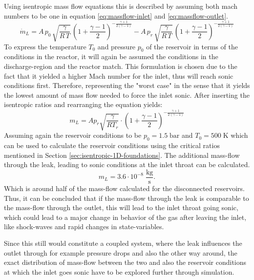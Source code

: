 	Using isentropic mass flow equations this is described by assuming both mach numbers to be one in equation \eqref{eq:massflow-inlet} and \eqref{eq:massflow-outlet}.
	$$
		\dot{m}_L =
		A\, p_0\, \sqrt{\frac{\gamma}{R\,T}}\, \left(1+\frac{\gamma-1}{2}\right)^{-\frac{\gamma+1}{2(\gamma-1)}}
		- A\, p_r\, \sqrt{\frac{\gamma}{R\,T}}\,\left(1+\frac{\gamma-1}{2}\right)^{-\frac{\gamma+1}{2(\gamma-1)}}
	$$
	To express the temperature $T_0$ and pressure $p_0$ of the reservoir in terms of the conditions in the reactor, it will again be assumed the conditions in the discharge-region and the reactor match.
	This formulation is chosen due to the fact that it yielded a higher Mach number for the inlet, thus will reach sonic conditions first.
	Therefore, representing the "worst case" in the sense that it yields the lowest amount of mass flow needed to force the inlet sonic.
	After inserting the isentropic ratios and rearranging the equation yields:
	\begin{equation}
		m_L =
		A p_r\sqrt{\frac{\gamma}{R T_r}}\cdot
			\left(
				1 + \frac{\gamma - 1}{2}
			\right)
				^{-\frac{\gamma + 1}{2\,(\gamma - 1)}}
	\end{equation}
	Assuming again the reservoir conditions to be $p_0 = 1.5\;\text{bar}$ and $T_0 = 500\;\text{K}$ which can be used to calculate the reservoir conditions using the critical ratios mentioned in Section \ref{sec:isentropic-1D-foundations}.
	The additional mass-flow through the leak, leading to sonic conditions at the inlet throat can be calculated.
	$$
		m_L = 3.6 \cdot 10^{-8} \; \frac{\text{kg}}{\text{s}}.
	$$
	Which is around half of the mass-flow calculated for the disconnected reservoirs.
	Thus, it can be concluded that if the mass-flow through the leak is comparable to the mass-flow through the outlet, this will lead to the inlet throat going sonic, which could lead to a major change in behavior of the gas after leaving the inlet, like shock-waves and rapid changes in state-variables.

	Since this still would constitute a coupled system, where the leak influences the outlet through for example pressure drops and also the other way around, the exact distribution of mass-flow between the two and also the reservoir conditions at which the inlet goes sonic have to be explored further through simulation.

